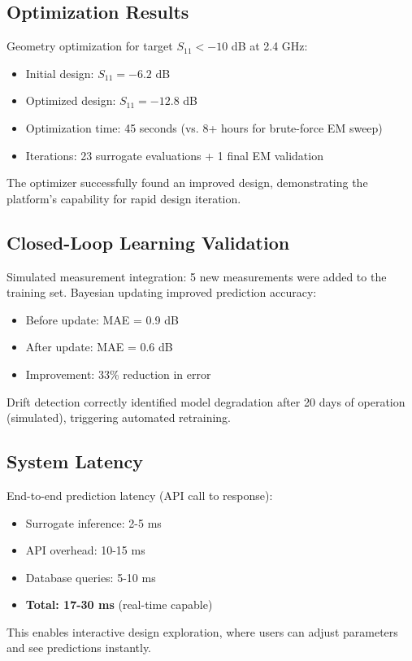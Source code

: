 \documentclass[conference]{IEEEtran}
\begin{document}
\subsection{Optimization Results}
Geometry optimization for target $S_{11} < -10$ dB at 2.4 GHz:
\begin{itemize}
    \item Initial design: $S_{11} = -6.2$ dB
    \item Optimized design: $S_{11} = -12.8$ dB
    \item Optimization time: 45 seconds (vs. 8+ hours for brute-force EM sweep)
    \item Iterations: 23 surrogate evaluations + 1 final EM validation
\end{itemize}

The optimizer successfully found an improved design, demonstrating the platform's capability for rapid design iteration.

\subsection{Closed-Loop Learning Validation}
Simulated measurement integration: 5 new measurements were added to the training set. Bayesian updating improved prediction accuracy:
\begin{itemize}
    \item Before update: MAE = 0.9 dB
    \item After update: MAE = 0.6 dB
    \item Improvement: 33\% reduction in error
\end{itemize}

Drift detection correctly identified model degradation after 20 days of operation (simulated), triggering automated retraining.

\subsection{System Latency}
End-to-end prediction latency (API call to response):
\begin{itemize}
    \item Surrogate inference: 2-5 ms
    \item API overhead: 10-15 ms
    \item Database queries: 5-10 ms
    \item \textbf{Total: 17-30 ms} (real-time capable)
\end{itemize}

This enables interactive design exploration, where users can adjust parameters and see predictions instantly.
\end{document}
